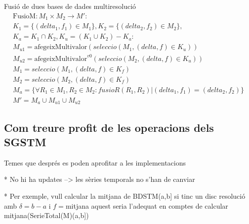 Fusió de dues bases de dades multiresolució
\begin{gather*}
    \text{FusioM}: M_1 \times M_2 \longrightarrow M': \\
    K_1 = \{(delta_1,f_1) \in M_1\},K_2 = \{(delta_2,f_2) \in M_2\}, \\
    K_a = K_1 \cap K_2, K_u =  (K_1 \cup K_2) - K_a : \\
    M_{u1} =\text{afegeixMultivalor}(seleccio(M_1, (delta,f) \in K_u))\\
    M_{u2} =\text{afegeixMultivalor}^{v0} (seleccio(M_2, (delta,f) \in K_u))\\
    M_1 = seleccio(M_1, (delta,f) \in K_f) \\
    M_2 = seleccio(M_2, (delta,f) \in K_f) \\
    M_a = \{\forall R_1\in M_1,R_2\in M_2: fusioR(R_1,R_2) |
       (delta_1,f_1) = (delta_2,f_2) \} \\
    M' =  M_{a} \cup  M_{u1}  \cup  M_{u2}     
\end{gather*}




\subsection{Com treure profit de les operacions dels SGSTM}

Temes que després es poden aprofitar a les implementacions

* No hi ha updates --> les sèries temporals no s'han de canviar

* Per exemple, vull calcular la mitjana de  BDSTM(a,b] si tinc un disc resolució amb $\delta=b-a$ i $f=$mitjana aquest seria l'adequat en comptes de calcular mitjana(SerieTotal(M)(a,b])











